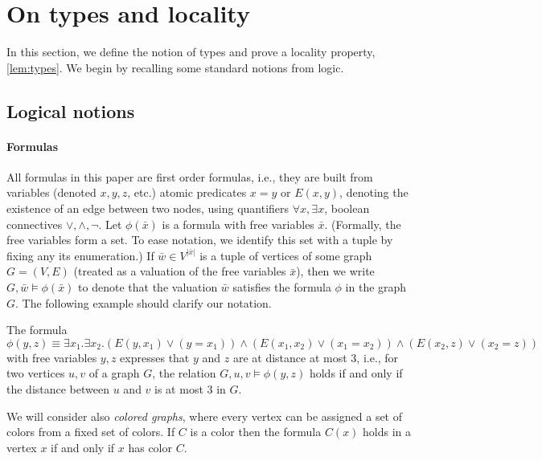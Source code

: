 \section{On types and locality}\label{sec:gaifman}
In this section, we define the notion of types 
and prove a locality property, \cref{lem:types}.
We begin by recalling some standard notions from logic.

\subsection{Logical notions}


%
%
%

\paragraph{Formulas}
All formulas in this paper are first order formulas,
i.e., they are built from variables (denoted $x,y,z$, etc.)
atomic predicates $x=y$ or $E(x,y)$,
denoting the existence of an edge between two nodes, using quantifiers $\forall x,\exists x$, boolean connectives $\lor,\land,\neg$. 
Let $\phi(\bar x)$ is a formula with free variables 
$\bar x$. (Formally, the free variables form a set.
To ease notation, we identify this set with a tuple by fixing any its enumeration.)
If $\bar w\in V^{|\bar x|}$ is a tuple of vertices of some graph $G=(V,E)$ (treated as a valuation of the free variables $\bar x$), then we write $G,\bar w\models \phi(\bar x)$
to denote that the valuation $\bar w$ satisfies the formula $\phi$ in the graph $G$.
The following example should clarify our notation.

\begin{example}\label{ex:dist-formula}
The formula
$$\phi(y,z)\equiv \exists x_1.\exists x_2. (E(y,x_1)\lor (y=x_1))\land (E(x_1,x_2)\lor (x_1=x_2))\land (E(x_2,z)\lor (x_2=z))$$
with free variables $y,z$ expresses that $y$ and $z$ are at distance at most $3$, 
i.e., for two vertices $u,v$ of a graph $G$,
the relation $G,u,v\models \phi(y,z)$ holds 
if and only if the distance between $u$ and $v$ is at most $3$ in $G$.
\end{example}

We will consider also \emph{colored graphs},
where every vertex can be assigned a set of colors from 
a fixed set of colors. If $C$ is a color then the formula $C(x)$ holds in a vertex $x$ if and only if $x$ has color $C$.

